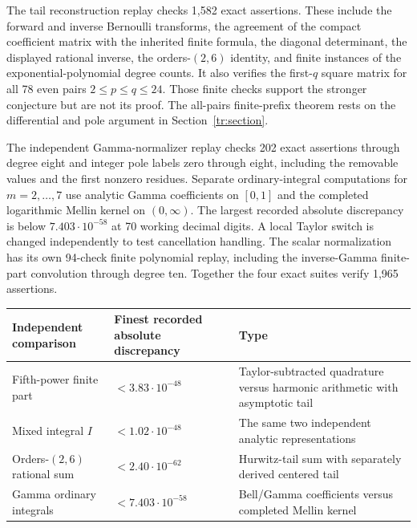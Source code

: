 \documentclass[11pt,a4paper]{article}
\numberwithin{equation}{section}
\theoremstyle{definition}
\begin{document}
The tail reconstruction replay checks 1,582 exact assertions. These
include the forward and inverse Bernoulli transforms, the agreement
of the compact coefficient matrix with the inherited finite formula,
the diagonal determinant, the displayed rational inverse, the
orders-$(2,6)$ identity, and finite instances of the
exponential-polynomial degree counts. It also verifies the first-$q$
square matrix for all 78 even pairs $2\le p\le q\le24$. Those
finite checks support the stronger conjecture but are not its proof.
The all-pairs finite-prefix theorem rests on the differential and
pole argument in Section~\ref{tr:section}.

The independent Gamma-normalizer replay checks 202 exact assertions
through degree eight and integer pole labels zero through eight,
including the removable values and the first nonzero residues.
Separate ordinary-integral computations for $m=2,\ldots,7$ use
analytic Gamma coefficients on $[0,1]$ and the completed logarithmic
Mellin kernel on $(0,\infty)$. The largest recorded absolute
discrepancy is below $7.403\cdot10^{-58}$ at 70 working decimal
digits. A local Taylor switch is changed independently to test
cancellation handling. The scalar normalization has its own 94-check finite polynomial
replay, including the inverse-Gamma finite-part convolution through
degree ten. Together the four exact suites verify 1,965 assertions.

\begin{center}
\small
\begin{tabular}{@{}>{\raggedright\arraybackslash}p{}>{\raggedright\arraybackslash}p{}>{\raggedright\arraybackslash}p{}@{}}
\toprule
Independent comparison & Finest recorded absolute discrepancy & Type \\
\midrule
Fifth-power finite part & $<3.83\cdot10^{-48}$ & Taylor-subtracted
quadrature versus harmonic arithmetic with asymptotic tail \\[4pt]
Mixed integral $I$ & $<1.02\cdot10^{-48}$ & The same two independent
analytic representations \\[4pt]
Orders-$(2,6)$ rational sum & $<2.40\cdot10^{-62}$ & Hurwitz-tail
sum with separately derived centered tail \\[4pt]
Gamma ordinary integrals & $<7.403\cdot10^{-58}$ & Bell/Gamma
coefficients versus completed Mellin kernel \\
\bottomrule
\end{tabular}
\end{center}
\end{document}
